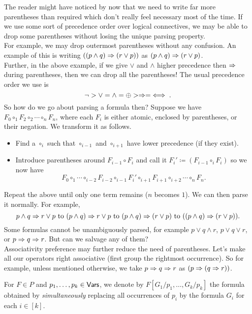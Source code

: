 The reader might have noticed by now that we need to write far more parentheses than required which don't really feel necessary most of the time. If we use some sort of precedence order over logical connectives, we may be able to drop some parentheses without losing the unique parsing property.\\
For example, we may drop outermost parentheses without any confusion. An example of this is writing $((p \wedge q)\Rightarrow (r \vee p))$ as $(p \wedge q)\Rightarrow (r \vee p)$.\\
Further, in the above example, if we give $\vee$ and $\wedge$ higher precedence then $\Rightarrow$ during parentheses, then we can drop all the parentheses! The usual precedence order we use is
\[ \neg > \vee = \wedge = \oplus > \Rightarrow = \iff. \]
So how do we go about parsing a formula then? Suppose we have $F_0\circ_1 F_2\circ_2 \cdots\circ_n F_n$, where each $F_i$ is either atomic, enclosed by parentheses, or their negation. We transform it as follows.
\begin{itemize}
    \item Find a $\circ_i$ such that $\circ_{i-1}$ and $\circ_{i+1}$ have lower precedence (if they exist).
    \item Introduce parentheses around $F_{i-1}\circ F_i$ and call it $F_i'\coloneqq (F_{i-1}\circ_i F_i)$ so we now have
    \[ F_0 \circ_1 \cdots \circ_{i-2} F_{i-2} \circ_{i-1} F_i' \circ_{i+1} F_{i+1} \circ_{i+2} \cdots \circ_n F_n. \]
\end{itemize}
Repeat the above until only one term remains ($n$ becomes $1$). We can then parse it normally. For example,
\[ p \wedge q \Rightarrow r \vee p \text{ to } (p\wedge q)\Rightarrow r\vee p \text{ to } (p\wedge q)\Rightarrow (r\vee p) \text{ to } ((p\wedge q)\Rightarrow (r\vee p)). \]
Some formulas cannot be unambiguously parsed, for example $p\vee q\wedge r$, $p \vee q \vee r$, or $p\Rightarrow q\Rightarrow r$. But can we salvage any of them?\\
Associativity preference may further reduce the need of parentheses. Let's make all our operators right associative (first group the rightmost occurrence). So for example, unless mentioned otherwise, we take $p\Rightarrow q\Rightarrow r$ as $(p\Rightarrow (q\Rightarrow r))$.

\begin{definition}
For $F\in P$ and $p_1,\ldots,p_k\in\mathsf{Vars}$, we denote by $F[G_1/p_1,\ldots,G_k/p_k]$ the formula obtained by \textit{simultaneously} replacing all occurrences of $p_i$ by the formula $G_i$ for each $i\in[k]$. 
\end{definition}

